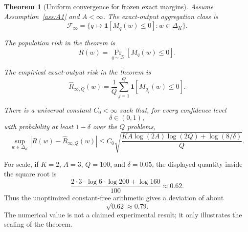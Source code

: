 \documentclass{article} %
\newtheorem{theorem}{Theorem}
\providecommand{\D}{\mathcal{D}}
\providecommand{\simplex}{\Delta_K}
\providecommand{\Risk}{R}
\providecommand{\Fcal}{\mathcal{F}}
\begin{document}
\begin{theorem}[Uniform convergence for frozen exact margins]
\label{thm:vc-app}
Assume Assumption~\ref{ass:A1} and \(A<\infty\). The exact-output aggregation
class is
\begin{equation}
\label{eq:thm-conv-class}
\Fcal_\infty
=
\Big\{
q\mapsto \mathbf 1[M_q(w)\le 0] : w\in\simplex
\Big\}.
\end{equation}

The population risk in the theorem is
\begin{equation}
\label{eq:thm-conv-risk}
\Risk(w)
=
\Pr_{q\sim\D}\!\left[M_q(w)\le 0\right].
\end{equation}

The empirical exact-output risk in the theorem is
\begin{equation}
\label{eq:thm-conv-erisk}
\widehat{\Risk}_{\infty,Q}(w)
=
\frac{1}{Q}\sum_{j=1}^{Q}
\mathbf 1\!\left[M_{q_j}(w)\le 0\right].
\end{equation}

There is a universal constant \(C_0<\infty\) such that, for every confidence
level
\begin{equation}
\label{eq:thm-conv-delta}
\delta\in(0,1),
\end{equation}
with probability at least \(1-\delta\) over the \(Q\) problems,
\begin{equation}
\label{eq:pf1-bound}
\sup_{w\in\simplex}
\left|
\Risk(w)-\widehat{\Risk}_{\infty,Q}(w)
\right|
\le
C_0
\sqrt{
\frac{
K A\log(2A)\log(2Q)+\log(8/\delta)
}{Q}
}.
\end{equation}
\end{theorem}

For scale, if \(K=2\), \(A=3\), \(Q=100\), and \(\delta=0.05\), the displayed
quantity inside the square root is
\begin{equation}
\label{eq:app-bound-example}
\frac{
2\cdot 3\cdot \log 6\cdot \log 200+\log 160
}{100}
\approx
0.62 .
\end{equation}
Thus the unoptimized constant-free arithmetic gives a deviation of about
\begin{equation}
\label{eq:app-bound-example-sqrt}
\sqrt{0.62}\approx 0.79 .
\end{equation}
The numerical value is not a claimed experimental result; it only illustrates the
scaling of the theorem.
\end{document}
